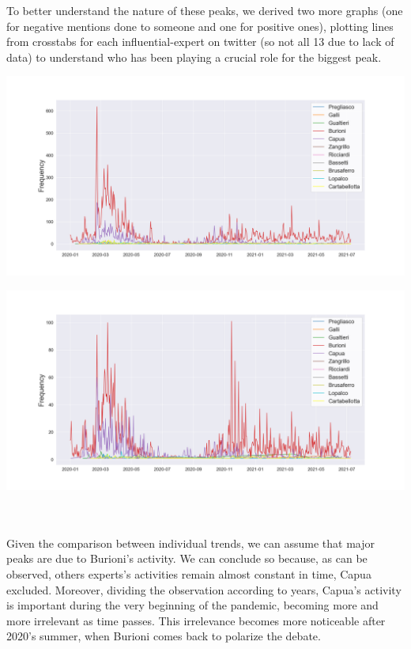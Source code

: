 \documentclass[sigchi]{acmart}
\begin{document}
To better understand the nature of these peaks, we derived two more graphs (one for negative mentions done to someone and one for positive ones), plotting lines from crosstabs for each influential-expert on twitter (so not all 13 due to lack of data) to understand who has been playing a crucial role for the biggest peak.
\begin{minipage}{0.5\textwidth}
\centering
\includegraphics[width=\textwidth]{img/Results/comparison/Sentiment_screenname_Negative_line.png}
\end{minipage}
\begin{minipage}{0.5\textwidth}
\centering
\includegraphics[width=\textwidth]{img/Results/comparison/Sentiment_screenname_Positive_line.png}
\end{minipage}
\\ \\
Given the comparison between individual trends, we can assume that major peaks are due to Burioni’s activity. We can conclude so because, as can be observed, others experts’s activities remain almost constant in time, Capua excluded. Moreover, dividing the observation according to years, Capua’s activity is important during the very beginning of the pandemic, becoming more and more irrelevant as time passes. This irrelevance becomes more noticeable after 2020’s summer, when Burioni comes back to polarize the debate.
\end{document}
